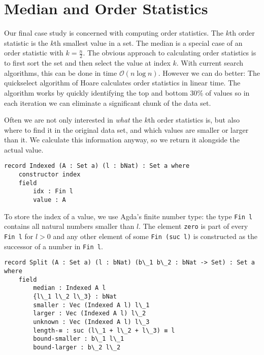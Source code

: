
\section{Median and Order Statistics}
Our final case study is concerned with computing order statistics. The $k$th order statistic is the $k$th smallest value in a set. The median is a special case of an order statistic with $k = \frac n 2$. The obvious approach to calculating order statistics is to first sort the set and then select the value at index $k$. With current search algorithms, this can be done in time $\mathcal O(n \log n)$. However we can do better: The quickselect algorithm of Hoare \cite{hoare:1961:quickselect} calculates order statistics in linear time. The algorithm works by quickly identifying the top and bottom 30\% of values so in each iteration we can eliminate a significant chunk of the data set.

Often we are not only interested in \emph{what} the $k$th order statistics is, but also where to find it in the original data set, and which values are smaller or larger than it. We calculate this information anyway, so we return it alongside the actual value.

\begin{lstlisting}[caption={The Indexed Type},label={lst:median:indexed},emph={Indexed,index}]
record Indexed (A : Set a) (l : bNat) : Set a where
    constructor index
    field
        idx : Fin l
        value : A
\end{lstlisting}

To store the index of a value, we use Agda's finite number type: the type \texttt{Fin l} contains all natural numbers smaller than $l$. The element \texttt{zero} is part of every \texttt{Fin l}  for $l > 0$ and any other element of some \texttt{Fin (suc l)} is constructed as the successor of a number in \texttt{Fin l}.

\begin{lstlisting}[caption={The Split Type},label={lst:median:split},emph={Split,Indexed}]
record Split (A : Set a) (l : bNat) (b\_1 b\_2 : bNat -> Set) : Set a where
    field
        median : Indexed A l
        {l\_1 l\_2 l\_3} : bNat
        smaller : Vec (Indexed A l) l\_1
        larger : Vec (Indexed A l) l\_2
        unknown : Vec (Indexed A l) l\_3
        length-≡ : suc (l\_1 + l\_2 + l\_3) ≡ l
        bound-smaller : b\_1 l\_1
        bound-larger : b\_2 l\_2
\end{lstlisting}

